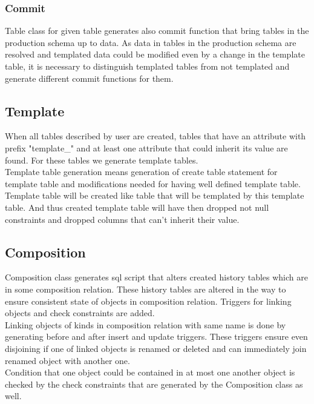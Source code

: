 \documentclass[deska]{subfiles}
\begin{document}
\subsubsection{Commit}
Table class for given table generates also commit function that bring tables in the production schema up to data. As data in tables in the production schema are resolved and templated data could be modified even by a change in the template table, it is necessary to distinguish templated tables from not templated and generate different commit functions for them.

\subsection{Template}
When all tables described by user are created, tables that have an attribute with prefix "template\_" and at least one attribute that could inherit its value are found. For these tables we generate template tables.\\
Template table generation means generation of create table statement for template table and modifications needed for having well defined template table.
Template table will be created like table that will be templated by this template table. And thus created template table will have then dropped not null constraints and dropped columns that can't inherit their value.

\subsection{Composition}
Composition class generates sql script that alters created history tables which are in some composition relation. These history tables are altered in the way to ensure consistent state of objects in composition relation. Triggers for linking objects and check constraints are added.\\
Linking objects of kinds in composition relation with same name is done by generating before and after insert and update triggers. These triggers ensure even disjoining if one of linked objects is renamed or deleted and can immediately join renamed object with another one.\\
Condition that one object could be contained in at most one another object is checked by the check constraints that are generated by the Composition class as well.
\end{document}
